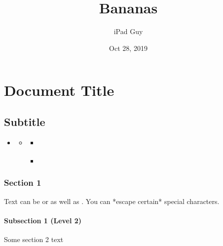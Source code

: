 \documentclass[letterpaper,10pt,english]{sphinxmanual}
\title{Bananas}
\date{Oct 28, 2019}
\author{iPad Guy}
\begin{document}
\pagestyle{empty}
\sphinxmaketitle
\pagestyle{plain}
\sphinxtableofcontents
\pagestyle{normal}
\label{\detokenize{index::doc}}



\chapter{Document Title}
\label{\detokenize{sample:document-title}}\label{\detokenize{sample::doc}}

\section{Subtitle}
\label{\detokenize{sample:subtitle}}
\begin{sphinxShadowBox}
\begin{itemize}
\item {} 
\label{\detokenize{sample:id4}}{\hyperref[\detokenize{sample:document-title}]{}}
\begin{itemize}
\item {} 
\label{\detokenize{sample:id5}}{\hyperref[\detokenize{sample:subtitle}]{}}
\begin{itemize}
\item {} 
\label{\detokenize{sample:id6}}{\hyperref[\detokenize{sample:section-1}]{}}

\item {} 
\label{\detokenize{sample:id7}}{\hyperref[\detokenize{sample:examples}]{}}

\end{itemize}

\end{itemize}

\end{itemize}
\end{sphinxShadowBox}


\subsection{Section 1}
\label{\detokenize{sample:section-1}}
Text can be  or   as well as .
You can *escape certain* special characters.


\subsubsection{Subsection 1 (Level 2)}
\label{\detokenize{sample:subsection-1-level-2}}
Some section 2 text
\end{document}

